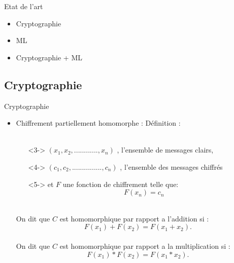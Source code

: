 \documentclass{beamer}
\begin{document}
  \begin{frame}{Etat de l'art}

    \begin{itemize}
  \item {
    Cryptographie
  }
  \item {
    ML
  }
    \item {
    Cryptographie + ML
  }
  \end{itemize}
\end{frame}

  \subsection{Cryptographie}
  
  \begin{frame}{Cryptographie}

    \begin{itemize}
    \item<1-> {
      Chiffrement partiellement homomorphe : Définition :\\
       \\

     \begin{itemize}[label={}]
           \item[]<3-> {
             $(x_1, x_2, ............, x_n)$ , l'ensemble de messages clairs, 
           }
           \item[]<4-> {  
             $(c_1, c_2, ..............., c_n)$ , l'ensemble des messages chiffrés
           }
           \item[]<5-> {
        et $ F$ une fonction de chiffrement telle que:\\
        $$F(x_n) = c_n$$
           }\\
     \end{itemize}

              {On dit que $C$ est homomorphique par rapport a l'addition si : \\
               $$F(x_1) + F(x_2) = F(x_1 + x_2).$$
                           }\\
       {On dit que $C$ est homomorphique par rapport a la multiplication si : \\
 $$F(x_1) * F(x_2) = F(x_1 * x_2).$$}
          }   
    
  \end{itemize}
\end{frame}
\end{document}
